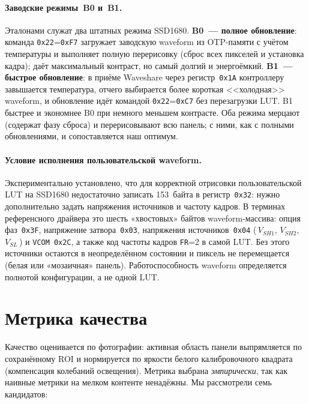 \paragraph{Заводские режимы~B0 и~B1.} Эталонами служат два штатных режима SSD1680.
\textbf{B0~--- полное обновление}: команда \texttt{0x22}=\texttt{0xF7} загружает заводскую waveform из
OTP-памяти с учётом температуры и выполняет полную перерисовку
(сброс всех пикселей и установка кадра); даёт максимальный контраст, но
самый долгий и энергоёмкий. \textbf{B1~--- быстрое обновление}: в приёме
Waveshare через регистр~\texttt{0x1A} контроллеру завышается
температура, отчего выбирается более короткая <<холодная>> waveform, и
обновление идёт командой \texttt{0x22}=\texttt{0xC7} без перезагрузки LUT.
B1 быстрее и экономнее B0 при немного меньшем контрасте. Оба режима мерцают
(содержат фазу сброса) и перерисовывают всю панель; с ними, как с полными
обновлениями, и сопоставляется наш оптимум.

\paragraph{Условие исполнения пользовательской waveform.} Экспериментально
установлено, что для корректной отрисовки пользовательской LUT на SSD1680
недостаточно записать 153~байта в регистр~\texttt{0x32}: нужно
дополнительно задать напряжения источников и частоту кадров. В терминах
референсного драйвера это шесть «хвостовых» байтов waveform-массива: опция
фаз~\texttt{0x3F}, напряжение затвора~\texttt{0x03}, напряжения
источников~\texttt{0x04} (\,$V_{SH1}$, $V_{SH2}$, $V_{SL}$\,) и
\texttt{VCOM}~\texttt{0x2C}, а также код частоты кадров \texttt{FR}=2 в самой LUT.
Без этого источники остаются в неопределённом состоянии и пиксель не
перемещается (белая или «мозаичная» панель). Работоспособность waveform
определяется полнотой конфигурации, а не одной LUT.

\section{Метрика качества}\label{sec:metric}

Качество оценивается по фотографии: активная область панели выпрямляется
по сохранённому ROI и нормируется по яркости белого калибровочного квадрата (компенсация
колебаний освещения). Метрика выбрана
\emph{эмпирически}, так как наивные метрики на мелком контенте ненадёжны. Мы рассмотрели семь кандидатов:

